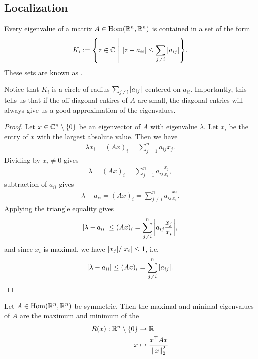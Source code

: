 \subsection{Localization}
\begin{theorem}
	Every eigenvalue of a matrix $A \in \textnormal{Hom}(\mathbb{R}^n, \mathbb{R}^n)$ is contained in a set of the form
	\begin{align*}
		K_i := \qty{z \in \mathbb{C}~\middle|~\abs{z - a_{ii}} \leq \sum_{j \neq i} \abs{a_{ij}}}.
	\end{align*}
	These sets are known as .
\end{theorem}
\noindent
Notice that $K_i$ is a circle of radius $\sum_{j \neq i} \abs{a_{ij}}$ centered on $a_{ii}$. Importantly, this tells us that if the off-diagonal entires of $A$ are small, the diagonal entries will always give us a good approximation of the eigenvalues.
\begin{proof}
	Let $x \in \mathbb{C}^n \setminus \qty{0}$ be an eigenvector of $A$ with eigenvalue $\lambda$. Let $x_i$ be the entry of $x$ with the largest absolute value. Then we have
	\begin{align*}
		\lambda x_i = (Ax)_i = \sum_{j = 1}^n a_{ij} x_j.
	\end{align*}
	Dividing by $x_i \neq 0$ gives
	\begin{align*}
		\lambda = (Ax)_i = \sum_{j = 1}^n a_{ij} \frac{x_j}{x_i},
	\end{align*}
	subtraction of $a_{ii}$ gives
	\begin{align*}
		\lambda - a_{ii} = (Ax)_i = \sum_{j \neq i}^n a_{ij} \frac{x_j}{x_i}.
	\end{align*}
	Applying the triangle equality gives
	\begin{align*}
		\abs{\lambda - a_{ii}} \leq (Ax)_i = \sum_{j \neq i}^n \abs{a_{ij} \frac{x_j}{x_i}},
	\end{align*}
	and since $x_i$ is maximal, we have $\abs{x_j}/\abs{x_i} \leq 1$, i.e.
	\begin{align*}
		\abs{\lambda - a_{ii}} \leq (Ax)_i = \sum_{j \neq i}^n \abs{a_{ij}}.
	\end{align*}
\end{proof}
\begin{theorem}
	Let $A \in \textnormal{Hom}(\mathbb{R}^n, \mathbb{R}^n)$ be symmetric. Then the maximal and minimal eigenvalues of $A$ are the maximum and minimum of the 
	\begin{align*}
		R(x) : \mathbb{R}^n \setminus \qty{0} &\to \mathbb{R}\\
		x &\mapsto \frac{x^\top A x}{\norm{x}_2^2}
	\end{align*}
\end{theorem}
